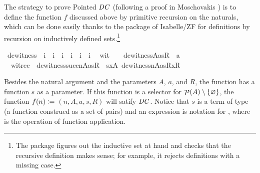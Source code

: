 The strategy to prove Pointed $\mathit{DC}$ (following a proof in Moschovakis
\cite{moschovakis1994notes}) is to define the function $f$ discussed above by
primitive recursion on the naturals, which can be done easily thanks
to the package of Isabelle/ZF
\cite{paulson1995set,paulson2000fixedpoint} for definitions by
recursion on inductively defined sets.\footnote{The package figures
  out the inductive set at hand and checks that the recursive
  definition makes sense; for example, it rejects definitions with a
  missing case.}

\begin{isabelle}\isamarkuptrue%
\isamarkupfalse%
\ dc{\isacharunderscore}witness\ {\isacharcolon}{\isacharcolon}\ {\isachardoublequoteopen}i\ {\isasymRightarrow}\ i\ {\isasymRightarrow}\ i\ {\isasymRightarrow}\ i\ {\isasymRightarrow}\ i\ {\isasymRightarrow}\ i{\isachardoublequoteclose}\isanewline
{}\isamarkupfalse%
\isanewline
\ \ wit{}\ \ \ {\isacharcolon}\ {\isachardoublequoteopen}dc{\isacharunderscore}witness{\isacharparenleft}{}{\isacharcomma}A{\isacharcomma}a{\isacharcomma}s{\isacharcomma}R{\isacharparenright}\ {\isacharequal}\ a{\isachardoublequoteclose}\isanewline
\ \ witrec\ {\isacharcolon}\ {\isachardoublequoteopen}dc{\isacharunderscore}witness{\isacharparenleft}succ{\isacharparenleft}n{\isacharparenright}{\isacharcomma}A{\isacharcomma}a{\isacharcomma}s{\isacharcomma}R{\isacharparenright}\ {\isacharequal}\ s{\isacharbackquote}{\isacharbraceleft}x{\isasymin}A{\isachardot}\ {\isasymlangle}dc{\isacharunderscore}witness{\isacharparenleft}n{\isacharcomma}A{\isacharcomma}a{\isacharcomma}s{\isacharcomma}R{\isacharparenright}{\isacharcomma}x{\isasymrangle}{\isasymin}R\ {\isacharbraceright}{\isachardoublequoteclose}
\end{isabelle}

Besides the natural argument and the parameters $A$, $a$, and $R$, the
function  has a function $s$ as a
parameter. If this function is a selector for $\mathop{\mathcal{P}}(A)\setminus \{\varnothing\}$, the
function
$f(n)\mathrel{\mathop:}= {}$$(n,A,a,s,R)$ will
satify $\mathit{DC}$. Notice that $s$ is a term of type  (a function
construed as a set of pairs) and an expression
 is notation for ,
where  is the operation
of function application.

